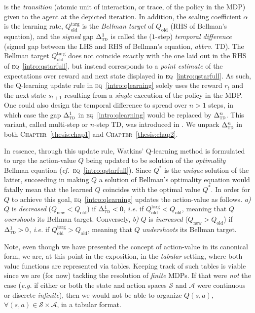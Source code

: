 is the \emph{transition} (atomic unit of interaction, or trace, of the policy in the MDP)
given to the agent at the depicted iteration.
In addition, the scaling coefficient $\alpha$ is the learning rate,
$Q_\text{old}^\text{targ}$ is the \emph{Bellman target} of $Q_\text{old}$ (RHS of Bellman's equation), and
the \emph{signed} gap $\Delta_\textsc{td}^1$ is called the ($1$-step) \emph{temporal difference}
(signed gap between the LHS and RHS of Bellman's equation, \textit{abbrv.} TD).
The Bellman target $Q_\text{old}^\text{targ}$ does not coincide exactly with
the one laid out in the RHS of \textsc{eq}~\ref{intro:qstarfull},
but instead corresponds to a \emph{point estimate} of the expectations over reward and next state
displayed in \textsc{eq}~\ref{intro:qstarfull}.
As such, the Q-learning update rule in \textsc{eq}~\ref{intro:qlearning}
solely uses the reward $r_t$ and the next state $s_{t+1}$
resulting from a \emph{single} execution of the policy in the MDP.
One could also design the temporal difference to spread over $n>1$ steps, in which case
the gap $\Delta_\textsc{td}^1$ in \textsc{eq}~\ref{intro:qlearning} would be replaced by $\Delta_\textsc{td}^n$.
This variant, called multi-step or $n$-step TD, was introduced in \cite{Peng1996-xn}.
We unpack $\Delta_\textsc{td}^n$ in both \textsc{Chapter}~\ref{thesis:chap1}
and \textsc{Chapter}~\ref{thesis:chap2}.

In essence, through this update rule, Watkins' Q-learning method \cite{Watkins1989-ir,Watkins1992-gl}
is formulated to urge the action-value $Q$ being updated to be solution of the \emph{optimality} Bellman equation
(\textit{cf.}~\textsc{eq}~\ref{intro:qstarfull}).
Since $Q^*$ is the \emph{unique} solution of the latter, succeeding in making $Q$ a solution of
Bellman's optimality equation would fatally mean that the learned $Q$ coincides with the optimal value $Q^*$.
In order for $Q$ to achieve this goal, \textsc{eq}~\ref{intro:qlearning} updates the action-value as follows.
\textit{a)} $Q$ is \emph{decreased} ($Q_\text{new} < Q_\text{old}$) if $\Delta_\textsc{td}^1 < 0$,
\textit{i.e.} if $Q_\text{old}^\text{targ} < Q_\text{old}$, meaning that $Q$ \emph{overshoots} its
Bellman target.
Conversely, \textit{b)} $Q$ is \emph{increased} ($Q_\text{new} > Q_\text{old}$) if $\Delta_\textsc{td}^1 > 0$,
\textit{i.e.} if $Q_\text{old}^\text{targ} > Q_\text{old}$, meaning that $Q$ \emph{undershoots} its
Bellman target.

Note, even though we have presented the concept of action-value in its canonical form,
we are, at this point in the exposition, in the \emph{tabular} setting,
where both value functions are represented via tables.
Keeping track of such tables is viable since we are (for now) tackling the resolution of \emph{finite} MDPs.
If that were \emph{not} the case (\textit{e.g.} if either or both the state and action spaces
$\mathcal{S}$ and $\mathcal{A}$ were continuous or discrete \emph{infinite}),
then we would not be able to organize $Q(s,a)$, $\forall (s,a) \in \mathcal{S} \times \mathcal{A}$,
in a tabular format.

